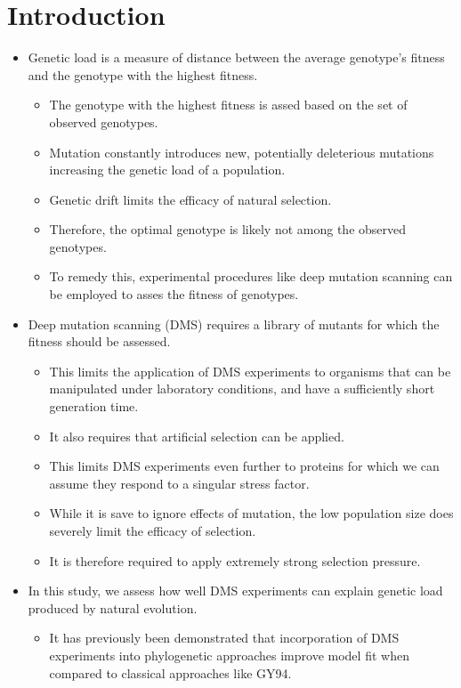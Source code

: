 \documentclass[12pt]{article}
\begin{document}
\section*{Introduction}
\begin{itemize}
	\item Genetic load is a measure of distance between the average genotype's fitness and the genotype with the highest fitness.
	\begin{itemize}
		\item The genotype with the highest fitness is assed based on the set of observed genotypes.
		\item Mutation constantly introduces new, potentially deleterious mutations increasing the genetic load of a population.
		\item Genetic drift limits the efficacy of natural selection.
		\item Therefore, the optimal genotype is likely not among the observed genotypes.
		\item To remedy this, experimental procedures like deep mutation scanning can be employed to asses the fitness of genotypes.
	\end{itemize}
	\item Deep mutation scanning (DMS) requires a library of mutants for which the fitness should be assessed.
	\begin{itemize}
		\item This limits the application of DMS experiments to organisms that can be manipulated under laboratory conditions, and have a sufficiently short generation time.
		\item It also requires that artificial selection can be applied.
		\item This limits DMS experiments even further to proteins for which we can assume they respond to a singular stress factor.
		\item While it is save to ignore effects of mutation, the low population size does severely limit the efficacy of selection.
		\item It is therefore required to apply extremely strong selection pressure.
	\end{itemize}
	\item In this study, we assess how well DMS experiments can explain genetic load produced by natural evolution.
	\begin{itemize}
		\item It has previously been demonstrated that incorporation of DMS experiments into phylogenetic approaches improve model fit when compared to classical approaches like GY94.

\end{itemize}
\end{itemize}
\end{document}
